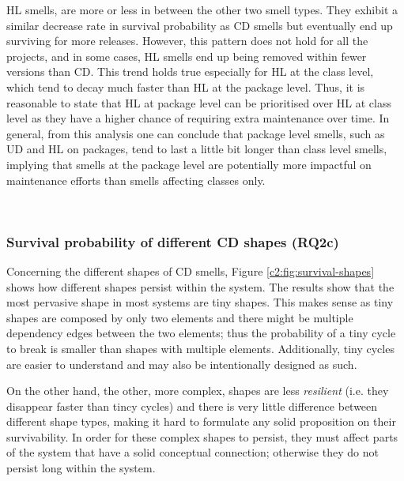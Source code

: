HL smells, are more or less in between the other two smell types. They exhibit a similar decrease rate in survival probability as CD smells but eventually end up surviving for more releases. However, this pattern does not hold for all the projects, and in some cases, HL smells end up being removed within fewer versions than CD.
This trend holds true especially for HL at the class level, which tend to decay much faster than HL at the package level.
Thus, it is reasonable to state that HL at package level can be prioritised over HL at class level as they have a higher chance of requiring extra maintenance over time.
In general, from this analysis one can conclude that package level smells, such as UD and HL on packages, tend to last a little bit longer than class level smells, implying that smells at the package level are potentially more impactful on maintenance efforts than smells affecting classes only.

\\
\subsubsection{Survival probability of different CD shapes (RQ2c)}
Concerning the different shapes of CD smells, Figure \ref{c2:fig:survival-shapes} shows how different shapes persist within the system.
The results show that the most pervasive shape in most systems are tiny shapes. This makes sense as tiny shapes are composed by only two elements and there might be multiple dependency edges between the two elements; thus the probability of a tiny cycle to break is smaller than shapes with multiple elements.
Additionally, tiny cycles are easier to understand and may also be intentionally designed as such.

On the other hand, the other, more complex, shapes are less \emph{resilient} (i.e. they disappear faster than tincy cycles) and there is very little difference between different shape types, making it hard to formulate any solid proposition on their survivability. In order for these complex shapes to persist, they must affect parts of the system that have a solid conceptual connection; otherwise they do not persist long within the system.

